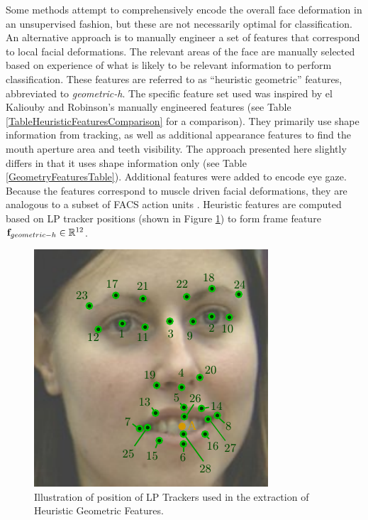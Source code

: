 Some \featureGeneration methods attempt to comprehensively encode the overall face deformation in an unsupervised fashion, but these are not necessarily optimal for classification. An alternative approach is to manually engineer a set of features that correspond to local facial deformations. The relevant areas of the face are manually selected based on experience of what is likely to be relevant information to perform classification. These features are referred to as ``heuristic geometric'' features, abbreviated to \textit{geometric-h}. The specific feature set used was inspired by el Kaliouby and Robinson's manually engineered features \cite{Kaliouby2005} (see Table \ref{TableHeuristicFeaturesComparison} for a comparison). They primarily use shape information from tracking, as well as additional appearance features to find the mouth aperture area and teeth visibility. The approach presented here slightly differs in that it uses shape information only (see Table \ref{GeometryFeaturesTable}). 
Additional features were added to encode eye gaze. 
Because the features correspond to muscle driven facial deformations, they are analogous to a subset of FACS action units \cite{Ekman1978}.
Heuristic features are computed based on LP tracker positions (shown in Figure \ref{FigureHeuristicTrackers}) to form frame feature $\textbf{f}_{geometric-h} \in \mathbb{R}^{12}$. %


\begin{figure}
\centering
\includegraphics[width = 0.6 \columnwidth]{nvcclass/HeuristicTrackers.pdf}
\caption{Illustration of position of LP Trackers used in the extraction of Heuristic Geometric Features.}
\label{FigureHeuristicTrackers}
\end{figure}

